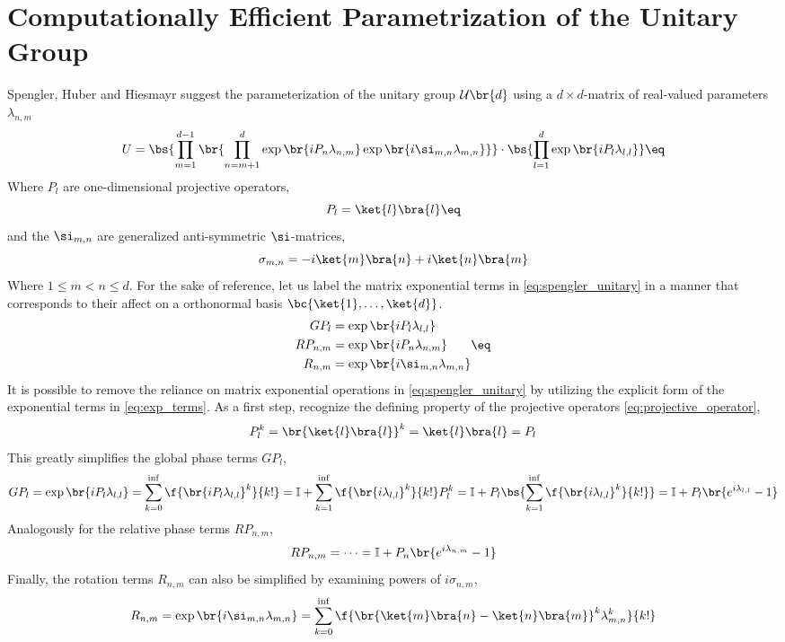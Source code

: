 \documentclass[aps, 10pt, english, twoside, pra, longbibliography]{revtex4-1}
\theoremstyle{plain}
\theoremstyle{definition}
\theoremstyle{remark}
\begin{document}
    \section{Computationally Efficient Parametrization of the Unitary Group}
    Spengler, Huber and Hiesmayr \cite{Spengler_2010_Unitary} suggest the parameterization of the unitary group $\mathcal{U}\br{d}$ using a $d\times d$-matrix of real-valued parameters $\lambda_{n, m}$
    \[ U = \bs{\prod_{m=1}^{d-1} \br{\prod_{n=m+1}^{d} \exp\br{i P_n \lambda_{n,m}}\exp\br{i \si_{m,n} \lambda_{m,n}}}} \cdot \bs{\prod_{l=1}^{d} \exp\br{iP_l \lambda_{l,l}}}  \eq \label{eq:spengler_unitary} \]
    Where $P_l$ are one-dimensional projective operators,
    \[ P_l = \ket{l}\bra{l} \eq \label{eq:projective_operator} \]
    and the $\si_{m,n}$ are generalized anti-symmetric $\si$-matrices,
    \[ \sigma_{m,n} = -i \ket{m}\bra{n} +i \ket{n}\bra{m} \]
    Where $1 \leq m < n \leq d$.
    For the sake of reference, let us label the matrix exponential terms in \cref{eq:spengler_unitary} in a manner that corresponds to their affect on a orthonormal basis $\bc{\ket{1}, \ldots, \ket{d}}$.
    \begin{align}
    \begin{split}
        GP_l &= \exp\br{iP_l \lambda_{l,l}} \\
        RP_{n,m} &= \exp\br{i P_n \lambda_{n,m}} \\
        R_{n,m} &= \exp\br{i \si_{m,n} \lambda_{m,n}}
    \end{split} \eq \label{eq:exp_terms}
    \end{align}
    It is possible to remove the reliance on matrix exponential operations in \cref{eq:spengler_unitary} by utilizing the explicit form of the exponential terms in \cref{eq:exp_terms}. As a first step, recognize the defining property of the projective operators \cref{eq:projective_operator},
    \[ P_l^k = \br{\ket{l}\bra{l}}^k = \ket{l}\bra{l} = P_l \]
    This greatly simplifies the global phase terms $GP_l$,
    \[ GP_l = \exp\br{iP_l \lambda_{l,l}} = \sum_{k=0}^{\inf} \f{\br{iP_l \lambda_{l,l}}^k}{k!} = \mathbb{I} + \sum_{k=1}^{\inf} \f{\br{i \lambda_{l,l}}^k}{k!}P_l^k = \mathbb{I} + P_l \bs{\sum_{k=1}^{\inf} \f{\br{i \lambda_{l,l}}^k}{k!}} = \mathbb{I} + P_l \br{e^{i \lambda_{l,l}} - 1} \]
    Analogously for the relative phase terms $RP_{n,m}$,
    \[ RP_{n,m} = \cdots = \mathbb{I} + P_n \br{e^{i \lambda_{n,m}} - 1} \]
    Finally, the rotation terms $R_{n,m}$ can also be simplified by examining powers of $i \sigma_{n,m}$,
    \[ R_{n,m} = \exp\br{i \si_{m,n} \lambda_{m,n}} = \sum_{k=0}^{\inf} \f{\br{\ket{m}\bra{n} - \ket{n}\bra{m}}^k \lambda_{m,n}^k}{k!} \]
\end{document}
